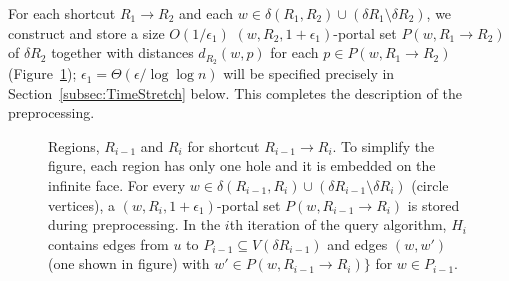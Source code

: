 \documentclass[11pt]{article}
\begin{document}
For each shortcut $R_1\rightarrow R_2$ and each $w\in\delta(R_1,R_2)\cup(\delta R_1\setminus\delta R_2)$, we construct and store a size $O(1/\epsilon_1)$ $(w,R_2,1+\epsilon_1)$-portal set $P(w,R_1\rightarrow R_2)$ of $\delta R_2$ together with distances $d_{R_2}(w,p)$ for each $p\in P(w,R_1\rightarrow R_2)$ (Figure~\ref{fig:PhaseIData}); $\epsilon_1 = \Theta(\epsilon/\log\log n)$ will be specified precisely in Section~\ref{subsec:TimeStretch} below. This completes the description of the preprocessing.
\begin{figure}\centerline{}
\caption{Regions, $R_{i-1}$ and $R_i$ for shortcut $R_{i-1}\rightarrow R_i$. To simplify the figure, each region has only one hole and it is embedded on the infinite face. For every $w\in\delta(R_{i-1},R_i)\cup(\delta R_{i-1}\setminus\delta R_i)$ (circle vertices), a $(w,R_i,1+\epsilon_1)$-portal set $P(w,R_{i-1}\rightarrow R_i)$ is stored during preprocessing. In the $i$th iteration of the query algorithm, $H_i$ contains edges from $u$ to $P_{i-1}\subseteq V(\delta R_{i-1})$ and edges $(w,w')$ (one shown in figure) with $w'\in P(w,R_{i-1}\rightarrow R_i)\}$ for $w\in P_{i-1}$.}
\label{fig:PhaseIData}
\end{figure}
\end{document}
